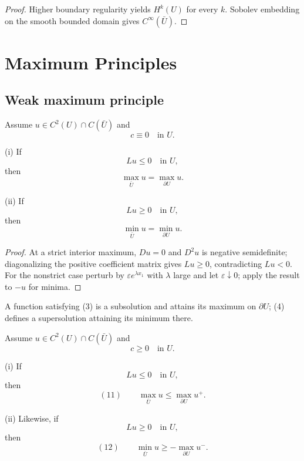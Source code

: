 \begin{proof}
\sketch Higher boundary regularity yields $H^k(U)$ for every $k$. Sobolev embedding on the smooth bounded domain gives $C^\infty(\bar U)$.
\end{proof}

\section{Maximum Principles}
\label{sec:elliptic-maximum-principles}

\subsection{Weak maximum principle}

\begin{theorem}
\label{thm:weak-maximum-principle-c-zero}
Assume $u \in C^2(U) \cap C(\bar U)$ and
$$c \equiv 0 \quad \text{in } U.$$

(i) If
$$Lu \leq 0 \quad \text{in } U,$$
then
$$\max_{\bar U} u = \max_{\partial U} u.$$

(ii) If
$$Lu \geq 0 \quad \text{in } U,$$
then
$$\min_{\bar U} u = \min_{\partial U} u.$$
\end{theorem}

\begin{proof}
\sketch At a strict interior maximum, $Du=0$ and $D^2u$ is negative semidefinite; diagonalizing the positive coefficient matrix gives $Lu\ge0$, contradicting $Lu<0$. For the nonstrict case perturb by $\varepsilon e^{\lambda x_1}$ with $\lambda$ large and let $\varepsilon\downarrow0$; apply the result to $-u$ for minima.
\end{proof}

\begin{remark}
\label{rem:subsolution-supersolution-terminology}
A function satisfying (3) is a subsolution and attains its maximum on $\partial U$; (4) defines a supersolution attaining its minimum there.
\end{remark}

\begin{theorem}
\label{thm:weak-maximum-principle-c-nonneg}
Assume $u \in C^2(U) \cap C(\bar U)$ and
$$c \geq 0 \quad \text{in } U.$$

(i) If
$$Lu \leq 0 \quad \text{in } U,$$
then
$$(11) \qquad \max_{\bar U} u \leq \max_{\partial U} u^+.$$

(ii) Likewise, if
$$Lu \geq 0 \quad \text{in } U,$$
then
$$(12) \qquad \min_{\bar U} u \geq -\max_{\partial U} u^-.$$
\end{theorem}

